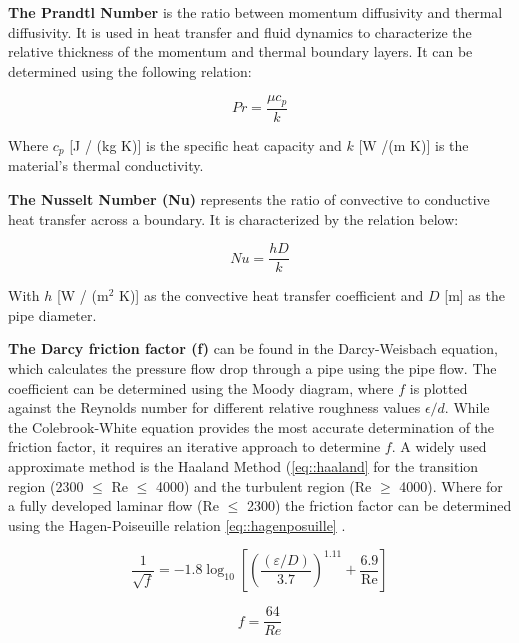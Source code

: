 \textbf{The Prandtl Number} is the ratio between momentum diffusivity and thermal diffusivity. It is used in heat transfer and fluid dynamics to characterize the relative thickness of the momentum and thermal boundary layers. It can be determined using the following relation: 

\begin{equation}
    Pr = \frac{\mu c_p}{k}
\end{equation}

Where $c_p$ [J / (kg K)] is the specific heat capacity and $k$ [W /(m K)] is the material's thermal conductivity. 

\textbf{The Nusselt Number (Nu)} represents the ratio of convective to conductive heat transfer across a boundary. It is characterized by the relation below:

\begin{equation}\label{eq::Nusselt}
    Nu = \frac{h D}{k}
\end{equation}

With $h$ [W / (m$^2$ K)] as the convective heat transfer coefficient and $D$ [m] as the pipe diameter. 

\textbf{The Darcy friction factor (f)} can be found in the Darcy-Weisbach equation, which calculates the pressure flow drop through a pipe using the pipe flow. The coefficient can be determined using the Moody diagram, where $f$ is plotted against the Reynolds number for different relative roughness values $\epsilon / d$. While the Colebrook-White equation provides the most accurate determination of the friction factor, it requires an iterative approach to determine $f$. A widely used approximate method is the Haaland Method (\ref{eq::haaland} for the transition region (2300 $\leq$ Re $\leq$ 4000) and the turbulent region (Re $\geq$ 4000). Where for a fully developed laminar flow (Re $\leq$ 2300) the friction factor can be determined using the Hagen-Poiseuille relation \ref{eq::hagenposuille} \cite{Darcyfrictionfactor}.

\begin{equation}\label{eq::haaland}
    \frac{1}{\sqrt{f}}=-1.8 \log _{10}\left[\left(\frac{(\varepsilon / D)}{3.7}\right)^{1.11}+\frac{6.9}{\operatorname{Re}}\right]
\end{equation}

\begin{equation}\label{eq::hagenposuille}
    f = \frac{64}{Re}
\end{equation}





